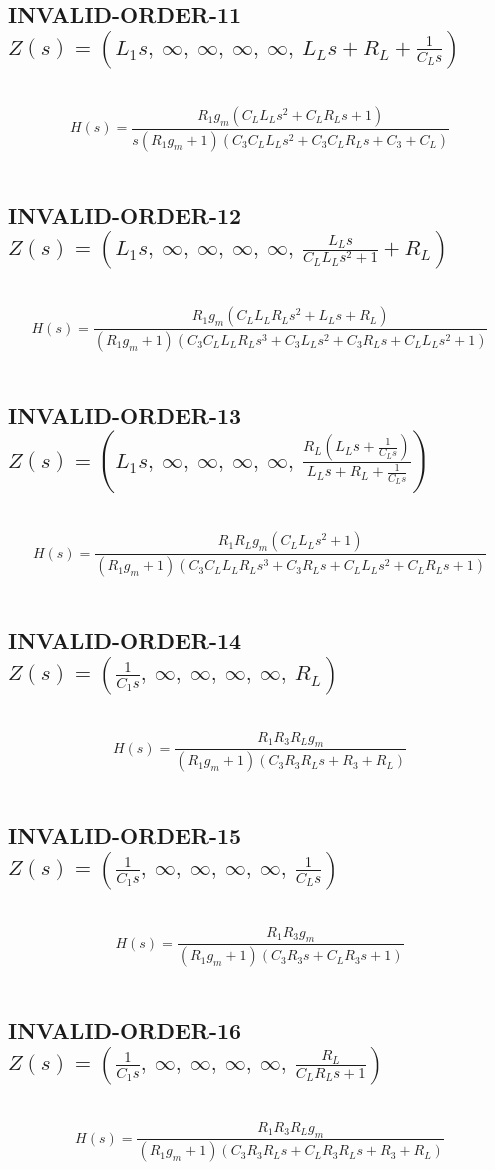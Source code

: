 \documentclass{article}
\begin{document}
\subsection{INVALID-ORDER-11 $Z(s) = \left( L_{1} s, \  \infty, \  \infty, \  \infty, \  \infty, \  L_{L} s + R_{L} + \frac{1}{C_{L} s}\right)$ } \ 
\textbf{\[H(s) = \frac{R_{1} g_{m} \left(C_{L} L_{L} s^{2} + C_{L} R_{L} s + 1\right)}{s \left(R_{1} g_{m} + 1\right) \left(C_{3} C_{L} L_{L} s^{2} + C_{3} C_{L} R_{L} s + C_{3} + C_{L}\right)}\] } \ 
\subsection{INVALID-ORDER-12 $Z(s) = \left( L_{1} s, \  \infty, \  \infty, \  \infty, \  \infty, \  \frac{L_{L} s}{C_{L} L_{L} s^{2} + 1} + R_{L}\right)$ } \ 
\textbf{\[H(s) = \frac{R_{1} g_{m} \left(C_{L} L_{L} R_{L} s^{2} + L_{L} s + R_{L}\right)}{\left(R_{1} g_{m} + 1\right) \left(C_{3} C_{L} L_{L} R_{L} s^{3} + C_{3} L_{L} s^{2} + C_{3} R_{L} s + C_{L} L_{L} s^{2} + 1\right)}\] } \ 
\subsection{INVALID-ORDER-13 $Z(s) = \left( L_{1} s, \  \infty, \  \infty, \  \infty, \  \infty, \  \frac{R_{L} \left(L_{L} s + \frac{1}{C_{L} s}\right)}{L_{L} s + R_{L} + \frac{1}{C_{L} s}}\right)$ } \ 
\textbf{\[H(s) = \frac{R_{1} R_{L} g_{m} \left(C_{L} L_{L} s^{2} + 1\right)}{\left(R_{1} g_{m} + 1\right) \left(C_{3} C_{L} L_{L} R_{L} s^{3} + C_{3} R_{L} s + C_{L} L_{L} s^{2} + C_{L} R_{L} s + 1\right)}\] } \ 
\subsection{INVALID-ORDER-14 $Z(s) = \left( \frac{1}{C_{1} s}, \  \infty, \  \infty, \  \infty, \  \infty, \  R_{L}\right)$ } \ 
\textbf{\[H(s) = \frac{R_{1} R_{3} R_{L} g_{m}}{\left(R_{1} g_{m} + 1\right) \left(C_{3} R_{3} R_{L} s + R_{3} + R_{L}\right)}\] } \ 
\subsection{INVALID-ORDER-15 $Z(s) = \left( \frac{1}{C_{1} s}, \  \infty, \  \infty, \  \infty, \  \infty, \  \frac{1}{C_{L} s}\right)$ } \ 
\textbf{\[H(s) = \frac{R_{1} R_{3} g_{m}}{\left(R_{1} g_{m} + 1\right) \left(C_{3} R_{3} s + C_{L} R_{3} s + 1\right)}\] } \ 
\subsection{INVALID-ORDER-16 $Z(s) = \left( \frac{1}{C_{1} s}, \  \infty, \  \infty, \  \infty, \  \infty, \  \frac{R_{L}}{C_{L} R_{L} s + 1}\right)$ } \ 
\textbf{\[H(s) = \frac{R_{1} R_{3} R_{L} g_{m}}{\left(R_{1} g_{m} + 1\right) \left(C_{3} R_{3} R_{L} s + C_{L} R_{3} R_{L} s + R_{3} + R_{L}\right)}\] } \ 
\end{document}
